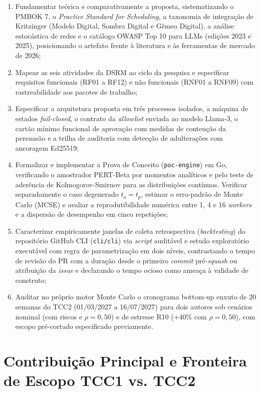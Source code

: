 \documentclass[12pt,openany,oneside,a4paper,english,brazilian,sumario=tradicional]{abntex2}
\begin{document}
\begin{enumerate}
  \item Fundamentar teórica e comparativamente a proposta, sistematizando o PMBOK 7, o \textit{Practice Standard for Scheduling}, a taxonomia de integração de Kritzinger (Modelo Digital, Sombra Digital e Gêmeo Digital), a análise estocástica de redes e o catálogo OWASP Top 10 para LLMs (edições 2023 e 2025), posicionando o artefato frente à literatura e às ferramentas de mercado de 2026;
  \item Mapear as seis atividades da DSRM \cite{peffers2007} ao ciclo da pesquisa e especificar requisitos funcionais (RF01 a RF12) e não funcionais (RNF01 a RNF09) com rastreabilidade aos pacotes de trabalho;
  \item Especificar a arquitetura proposta em três processos isolados, a máquina de estados \textit{fail-closed}, o contrato da \textit{allowlist} enviada ao modelo Llama-3, o cartão mínimo funcional de aprovação com medidas de contenção da persuasão e a trilha de auditoria com detecção de adulterações com ancoragem Ed25519;
  \item Formalizar e implementar a Prova de Conceito (\texttt{poc-engine}) em Go, verificando o amostrador PERT-Beta por momentos analíticos e pelo teste de aderência de Kolmogorov-Smirnov para as distribuições contínuas. Verificar separadamente o caso degenerado $t_o=t_p$, estimar o erro-padrão de Monte Carlo (MCSE) e avaliar a reprodutibilidade numérica entre 1, 4 e 16 \textit{workers} e a dispersão de desempenho em cinco repetições;
  \item Caracterizar empiricamente janelas de coleta retrospectiva (\textit{back\-testing}) do repositório GitHub CLI (\texttt{cli/\allowbreak cli}) via \textit{script} auditável e estudo exploratório executável com regra de parametrização em dois níveis, contrastando o tempo de revisão do PR com a duração desde o primeiro \textit{commit} pré-\textit{squash} ou atribuição da \textit{issue} e declarando o tempo ocioso como ameaça à validade de construto;
  \item Auditar no próprio motor Monte Carlo o cronograma bottom-up enxuto de 20 semanas do TCC2 (01/03/2027 a 16/07/2027) para dois autores sob cenários nominal (com riscos e $\rho=0{,}50$) e de estresse R10 (+40\% com $\rho=0{,}50$), com escopo pré-cortado especificado previamente.
\end{enumerate}

\section{Contribuição Principal e Fronteira de Escopo TCC1 vs. TCC2}\label{sec:contribuicao_escopo}
\end{document}
